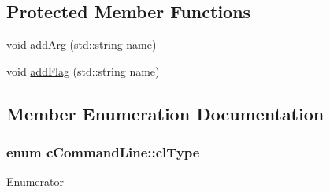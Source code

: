 \subsection*{Protected Member Functions}
\begin{DoxyCompactItemize}
\item 
void \hyperlink{classcCommandLine_a5eb5fa00de9315e96d44adaa5f2fb219}{add\-Arg} (std\-::string name)
\item 
void \hyperlink{classcCommandLine_a56d73201382df496e68984f2bdc4847b}{add\-Flag} (std\-::string name)
\end{DoxyCompactItemize}


\subsection{Member Enumeration Documentation}
\hypertarget{classcCommandLine_a81ec4892969530bbd91486e6cb872054}{
\subsubsection[{cl\-Type}]{\setlength{\rightskip}{0pt plus 5cm}enum {\bf c\-Command\-Line\-::cl\-Type}}}\label{classcCommandLine_a81ec4892969530bbd91486e6cb872054}
\begin{Desc}
\item[Enumerator]\par
\begin{description}
\item[{\em 
\hypertarget{classcCommandLine_a81ec4892969530bbd91486e6cb872054ae373dbf7e049b7d7fdbe75c4f91696cd}{clt\-Flag}\label{classcCommandLine_a81ec4892969530bbd91486e6cb872054ae373dbf7e049b7d7fdbe75c4f91696cd}
}]\item[{\em 
\hypertarget{classcCommandLine_a81ec4892969530bbd91486e6cb872054abf74da44500e2e049b5e00063306ee2e}{clt\-Argument}\label{classcCommandLine_a81ec4892969530bbd91486e6cb872054abf74da44500e2e049b5e00063306ee2e}
}]\end{description}
\end{Desc}


